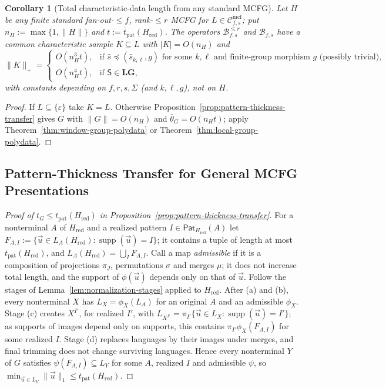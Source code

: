 \documentclass[11pt]{article}
\numberwithin{equation}{section}
\theoremstyle{plain}
\newtheorem{corollary}[theorem]{Corollary}
\theoremstyle{definition}
\theoremstyle{remark}
\newcommand{\Cmcf}[2]{\mathcal{C}^{\mathrm{mcf}}_{#1,#2}}
\newcommand{\tuple}[1]{\vec{#1}}
\newcommand{\eps}{\varepsilon}
\theoremstyle{plain}
\begin{document}
\begin{corollary}[Total characteristic-data length from any standard MCFG]
\label{cor:unrestricted-standard-mcfg-data}
Let $H$ be any finite standard fan-out-$\le f$, rank-$\le r$ MCFG for
$L\in\Cmcf{f}{s}$; put $n_H:=\max\{1,\|H\|\}$ and
$t:=\bar t_{\mathrm{pat}}(H_{\mathrm{red}})$.  The operators
$\mathcal B^{\le r}_{f,s}$ and $\mathcal B_{f,s}$ have a common characteristic
sample $K\subseteq L$ with
$|K|=O(n_H)$ and
\[
 \|K\|_+=
 \begin{cases}
 O(n_H^3t),&\text{if }\widehat s\preceq(\widehat s_{k,\ell},g)\text{ for some }k,\ell
 \text{ and finite-group morphism }g\text{ (possibly trivial)},\\
 O(n_H^4t),&\text{if }\mathsf S\in\mathbf{LG},
 \end{cases}
\]
with constants depending on $f,r,s,\Sigma$ (and $k,\ell,g$), not on $H$.
\end{corollary}

\begin{proof}
If $L\subseteq\{\eps\}$ take $K=L$.  Otherwise
Proposition~\ref{prop:pattern-thickness-transfer} gives $G$ with $\|G\|=O(n_H)$ and
$\bar\theta_G=O(n_Ht)$; apply Theorem~\ref{thm:window-group-polydata} or
Theorem~\ref{thm:local-group-polydata}.
\end{proof}

\subsection{Pattern-Thickness Transfer for General MCFG Presentations}
\label{app:pattern-thickness}

\begin{proof}[Proof of $t_G\le t_{\mathrm{pat}}(H_{\mathrm{red}})$ in
Proposition~\ref{prop:pattern-thickness-transfer}]
For a nonterminal $A$ of $H_{\mathrm{red}}$ and a realized pattern
$I\in\mathsf{Pat}_{H_{\mathrm{red}}}(A)$
let $F_{A,I}:=\{\tuple u\in L_A(H_{\mathrm{red}}):\operatorname{supp}(\tuple u)=I\}$; it
contains a tuple of length at most $t_{\mathrm{pat}}(H_{\mathrm{red}})$, and
$L_A(H_{\mathrm{red}})=\bigcup_IF_{A,I}$.  Call a map \emph{admissible} if it is a composition of
projections $\pi_J$, permutations $\sigma$ and merges $\mu$; it does not increase total
length, and the support of $\phi(\tuple u)$ depends only on that of $\tuple u$.  Follow
the stages of Lemma~\ref{lem:normalization-stages} applied to $H_{\mathrm{red}}$.
After (a) and (b), every nonterminal $X$ has $L_X=\phi_X(L_A)$ for an original $A$ and
an admissible $\phi_X$.  Stage (c) creates $X^{I'}$, for realized $I'$, with
$L_{X^{I'}}=\pi_{I'}\{\tuple u\in L_X:\operatorname{supp}(\tuple u)=I'\}$; as supports of
images depend only on supports, this contains $\pi_{I'}\phi_X(F_{A,I})$ for some realized
$I$.  Stage (d) replaces languages by their images under merges, and final trimming does
not change surviving languages.  Hence every nonterminal $Y$ of $G$ satisfies
$\psi(F_{A,I})\subseteq L_Y$ for some $A$, realized $I$ and admissible $\psi$, so
$\min_{\tuple u\in L_Y}\|\tuple u\|_1\le t_{\mathrm{pat}}(H_{\mathrm{red}})$.
\end{proof}
\end{document}
